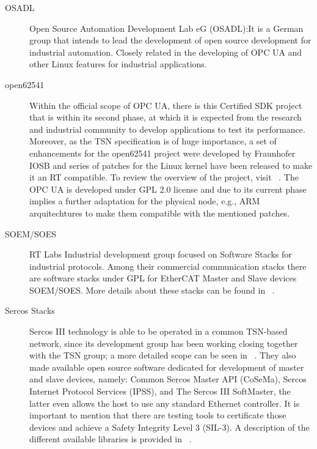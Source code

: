 \begin{description}
    \item[OSADL] Open Source Automation Development Lab eG (OSADL):It is a German group that intends to lead the development of open source development
    for industrial automation. Closely related in the developing of OPC UA and other Linux features for industrial applications.
    \item[open62541] Within the official scope of OPC UA, there is this Certified SDK project that is within its second phase, at which it is expected 
    from the research and industrial community to develop applications to test its performance. Moreover, as the TSN specification is of huge importance, 
    a set of enhancements for the open62541 project were developed by Fraunhofer IOSB and series of patches for the Linux kernel have been released to 
    make it an RT compatible. To review the overview of the project, visit ~\cite{open62541_homepage}. %
    The OPC UA is developed under GPL 2.0 license and due to its current phase implies a further adaptation for the physical node, e.g., ARM arquitechtures 
    to make them compatible with the mentioned patches. 
    \item[SOEM/SOES] RT Labs Industrial development group focused on Software Stacks for industrial protocols. Among their commercial communication stacks
    there are software stacks under GPL for EtherCAT Master and Slave devices SOEM/SOES. More details about these stacks can be found in ~\cite{soesm_homepage}. %
    \item[Sercos Stacks] Sercos III technology is able to be operated in a common TSN-based network, %
    since its development group has been working closing together with the TSN group; a more detailed scope can be seen in ~\cite{sercos_tsn}. 
    They also made available open source software dedicated for development of master and slave devices, namely: Common Sercos Master API (CoSeMa),
    Sercos Internet Protocol Services (IPSS), and The Sercos III SoftMaster, the latter even allows the host to use any standard Ethernet controller. %
    It is important to mention that there are testing tools to certificate those devices and achieve a Safety Integrity Level 3 (SIL-3). A description of the
    different available libraries is provided in ~\cite{sercos_stacks}.

\end{description}
